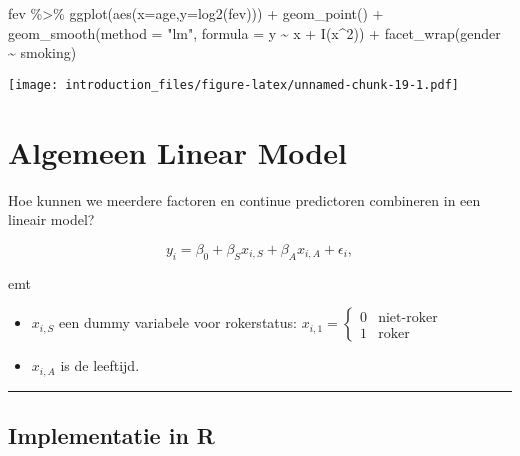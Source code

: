 \documentclass[
]{article}
\newenvironment{Shaded}{\begin{snugshade}}{\end{snugshade}}
\newcommand{\AttributeTok}[1]{\textcolor[rgb]{0.77,0.63,0.00}{#1}}
\newcommand{\DecValTok}[1]{\textcolor[rgb]{0.00,0.00,0.81}{#1}}
\newcommand{\FunctionTok}[1]{\textcolor[rgb]{0.00,0.00,0.00}{#1}}
\newcommand{\NormalTok}[1]{#1}
\newcommand{\SpecialCharTok}[1]{\textcolor[rgb]{0.00,0.00,0.00}{#1}}
\newcommand{\StringTok}[1]{\textcolor[rgb]{0.31,0.60,0.02}{#1}}
\providecommand{\tightlist}{%
  \setlength{\itemsep}{0pt}\setlength{\parskip}{0pt}}
\begin{document}
\begin{Shaded}
\begin{Highlighting}[]
\NormalTok{fev }\SpecialCharTok{\%\textgreater{}\%} 
  \FunctionTok{ggplot}\NormalTok{(}\FunctionTok{aes}\NormalTok{(}\AttributeTok{x=}\NormalTok{age,}\AttributeTok{y=}\FunctionTok{log2}\NormalTok{(fev))) }\SpecialCharTok{+} 
  \FunctionTok{geom\_point}\NormalTok{() }\SpecialCharTok{+}
  \FunctionTok{geom\_smooth}\NormalTok{(}\AttributeTok{method =} \StringTok{"lm"}\NormalTok{, }\AttributeTok{formula =}\NormalTok{ y }\SpecialCharTok{\textasciitilde{}}\NormalTok{ x }\SpecialCharTok{+} \FunctionTok{I}\NormalTok{(x}\SpecialCharTok{\^{}}\DecValTok{2}\NormalTok{)) }\SpecialCharTok{+}
  \FunctionTok{facet\_wrap}\NormalTok{(gender }\SpecialCharTok{\textasciitilde{}}\NormalTok{ smoking)}
\end{Highlighting}
\end{Shaded}

\texttt{[image: introduction\_files/figure-latex/unnamed-chunk-19-1.pdf]}

\hypertarget{algemeen-linear-model}{%
\section{Algemeen Linear Model}\label{algemeen-linear-model}}

Hoe kunnen we meerdere factoren en continue predictoren combineren in
een lineair model?

\[
y_i= \beta_0 + \beta_S x_{i,S} + \beta_A x_{i,A}  +\epsilon_i,
\]

emt

\begin{itemize}
\tightlist
\item
  \(x_{i,S}\) een dummy variabele voor rokerstatus:
  \(x_{i,1}=\begin{cases} 0& \text{niet-roker}\\ 1& \text{roker} \end{cases}\)
\item
  \(x_{i,A}\) is de leeftijd.
\end{itemize}

\begin{center}\rule{0.5\linewidth}{0.5pt}\end{center}

\hypertarget{implementatie-in-r}{%
\subsection{Implementatie in R}\label{implementatie-in-r}}
\end{document}
